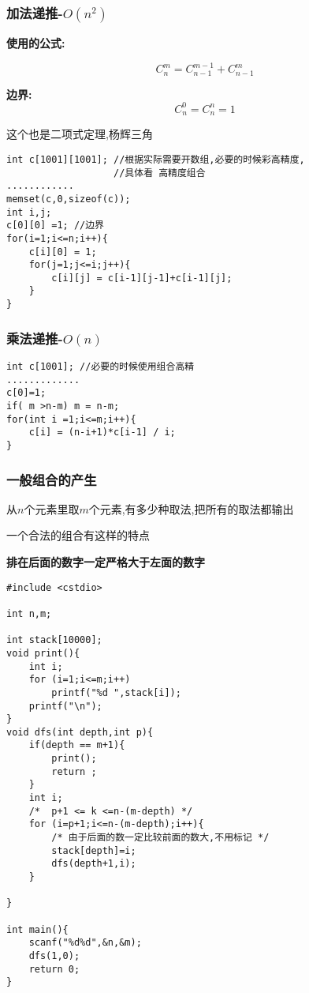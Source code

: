 \subsubsection{加法递推-$O(n^2)$}

\textbf{使用的公式:}

$$C_{n}^{m} = C_{n-1}^{m-1}+C_{n-1}^{m}$$

\textbf{边界:}
$$
C_n^0=C_n^n = 1
$$

这个也是二项式定理,杨辉三角

\begin{lstlisting}
int c[1001][1001]; //根据实际需要开数组,必要的时候彩高精度,
                   //具体看 高精度组合
............
memset(c,0,sizeof(c));
int i,j;
c[0][0] =1; //边界
for(i=1;i<=n;i++){
    c[i][0] = 1;
    for(j=1;j<=i;j++){
        c[i][j] = c[i-1][j-1]+c[i-1][j];
    }
}
\end{lstlisting}

\subsubsection{乘法递推-$O(n)$}

\begin{lstlisting}
int c[1001]; //必要的时候使用组合高精
.............
c[0]=1;
if( m >n-m) m = n-m;
for(int i =1;i<=m;i++){
    c[i] = (n-i+1)*c[i-1] / i;
}
\end{lstlisting}

\subsubsection{一般组合的产生}

从$n$个元素里取$m$个元素,有多少种取法,把所有的取法都输出

一个合法的组合有这样的特点

\textbf{排在后面的数字一定严格大于左面的数字}

\begin{lstlisting}
#include <cstdio>

int n,m;

int stack[10000];
void print(){
    int i;
    for (i=1;i<=m;i++)
        printf("%d ",stack[i]);
    printf("\n");
}
void dfs(int depth,int p){
    if(depth == m+1){
        print();
        return ;
    }
    int i;
    /*  p+1 <= k <=n-(m-depth) */
    for (i=p+1;i<=n-(m-depth);i++){
        /* 由于后面的数一定比较前面的数大,不用标记 */
        stack[depth]=i;
        dfs(depth+1,i);
    }

}

int main(){
    scanf("%d%d",&n,&m);
    dfs(1,0);
    return 0;
}
\end{lstlisting}



